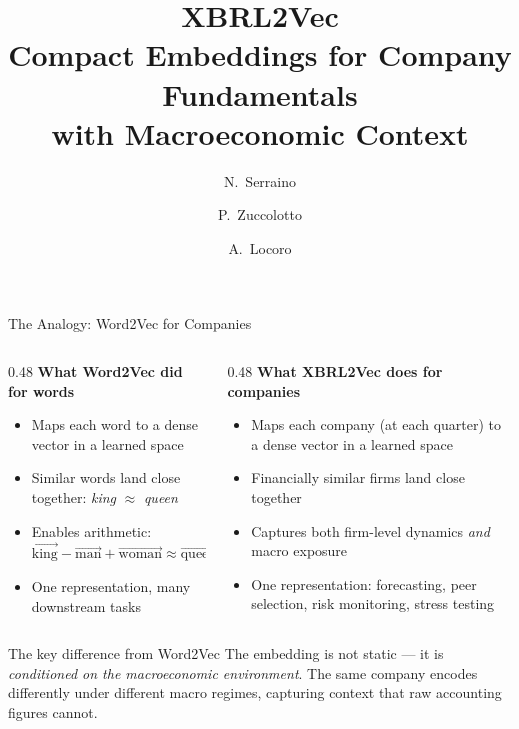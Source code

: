 \documentclass[aspectratio=169]{beamer}
\title[XBRL2Vec]{\textbf{XBRL2Vec}\\[4pt]
  \large Compact Embeddings for Company Fundamentals\\with Macroeconomic Context}
\author{N.\ Serraino \and P.\ Zuccolotto \and A.\ Locoro}
\institute{University of Brescia \quad$\cdot$\quad Intesa Sanpaolo}
\date{}
\begin{document}
\begin{frame}
  \titlepage
\end{frame}

\begin{frame}{The Analogy: Word2Vec for Companies}

  \begin{columns}[T]
    \begin{column}{0.48\textwidth}
      \textbf{What Word2Vec did for words}
      \begin{itemize}
        \item Maps each word to a dense vector in a learned space
        \item Similar words land close together: \textit{king} $\approx$ \textit{queen}
        \item Enables arithmetic: $\vec{\text{king}} - \vec{\text{man}} + \vec{\text{woman}} \approx \vec{\text{queen}}$
        \item One representation, many downstream tasks
      \end{itemize}
    \end{column}
    \begin{column}{0.48\textwidth}
      \textbf{What XBRL2Vec does for companies}
      \begin{itemize}
        \item Maps each company (at each quarter) to a dense vector in a learned space
        \item Financially similar firms land close together
        \item Captures both firm-level dynamics \emph{and} macro exposure
        \item One representation: forecasting, peer selection, risk monitoring, stress testing
      \end{itemize}
    \end{column}
  \end{columns}

  \vspace{0.8em}
  \begin{block}{The key difference from Word2Vec}
    The embedding is not static — it is \emph{conditioned on the macroeconomic
    environment}.  The same company encodes differently under different macro
    regimes, capturing context that raw accounting figures cannot.
  \end{block}

\end{frame}
\end{document}
